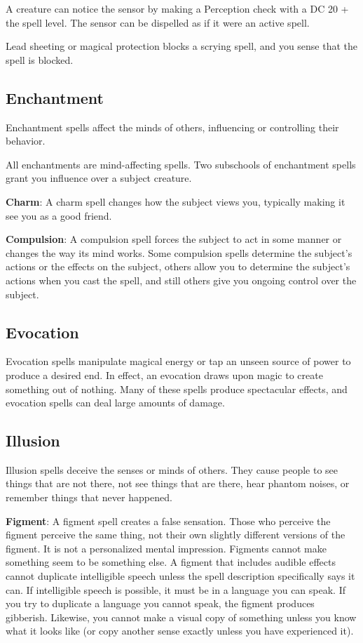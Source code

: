 A creature can notice the sensor by making a Perception check with a DC 20 + the spell level. The sensor can be dispelled as if it were an active spell.
				
Lead sheeting or magical protection blocks a scrying spell, and you sense that the spell is blocked.
				
\subsection{Enchantment}

				
Enchantment spells affect the minds of others, influencing or controlling their behavior.
				
All enchantments are mind-affecting spells. Two subschools of enchantment spells grant you influence over a subject creature.
				
\textbf{Charm}: A charm spell changes how the subject views you, typically making it see you as a good friend.
				
\textbf{Compulsion}: A compulsion spell forces the subject to act in some manner or changes the way its mind works. Some compulsion spells determine the subject's actions or the effects on the subject, others allow you to determine the subject's actions when you cast the spell, and still others give you ongoing control over the subject.
				
\subsection{Evocation}

				
Evocation spells manipulate magical energy or tap an unseen source of power to produce a desired end. In effect, an evocation draws upon magic to create something out of nothing. Many of these spells produce spectacular effects, and evocation spells can deal large amounts of damage.
				
\subsection{Illusion}

				
Illusion spells deceive the senses or minds of others. They cause people to see things that are not there, not see things that are there, hear phantom noises, or remember things that never happened.
				
\textbf{Figment}: A figment spell creates a false sensation. Those who perceive the figment perceive the same thing, not their own slightly different versions of the figment. It is not a personalized mental impression. Figments cannot make something seem to be something else. A figment that includes audible effects cannot duplicate intelligible speech unless the spell description specifically says it can. If intelligible speech is possible, it must be in a language you can speak. If you try to duplicate a language you cannot speak, the figment produces gibberish. Likewise, you cannot make a visual copy of something unless you know what it looks like (or copy another sense exactly unless you have experienced it).
				
